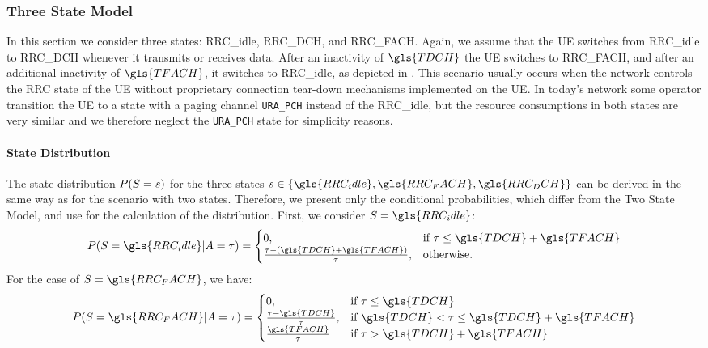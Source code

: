 \subsubsection*{Three State Model}\label{sec:network:performance_model:analytical_model:three_states}
In this section we consider three states: \gls{RRC_idle}, \gls{RRC_DCH}, and \gls{RRC_FACH}.
Again, we assume that the \gls{UE} switches from \gls{RRC_idle} to \gls{RRC_DCH} whenever it transmits or receives data.
After an inactivity of \(\gls{TDCH}\) the \gls{UE} switches to \gls{RRC_FACH}, and after an additional inactivity of \(\gls{TFACH}\), it switches to \gls{RRC_idle}, as depicted in .
This scenario usually occurs when the network controls the \gls{RRC} state of the \gls{UE} without proprietary connection tear-down mechanisms implemented on the \gls{UE}.
In today's network some operator transition the \gls{UE} to a state with a paging channel \texttt{URA\_PCH} instead of the \gls{RRC_idle}, but the resource consumptions in both states are very similar and we therefore neglect the \texttt{URA\_PCH} state for simplicity reasons.

\paragraph*{State Distribution}
The state distribution \(P(S=s)\) for the three states \(\RRCStateRealization\in\{\gls{RRC_idle},\gls{RRC_FACH},\gls{RRC_DCH}\}\) can be derived in the same way as for the scenario with two states.
Therefore, we present only the conditional probabilities, which differ from the Two State Model, and use  for the calculation of the distribution.
First, we consider \(\RRCState=\gls{RRC_idle}\): 
\begin{equation*} 
P(\RRCState=\gls{RRC_idle} \vert \PacketIAT = \ObservationIntervalLength) =
\begin{cases} 
	0,  & \mbox{if } \ObservationIntervalLength \leq \gls{TDCH}+\gls{TFACH} \\ 
	\frac{\ObservationIntervalLength - (\gls{TDCH}+\gls{TFACH})}{\ObservationIntervalLength}, 
	    & \mbox{otherwise.}
\end{cases}
\end{equation*}
For the case of \(\RRCState=\gls{RRC_FACH}\), we have:
\begin{equation*} 
P(\RRCState=\gls{RRC_FACH} \vert \PacketIAT = \ObservationIntervalLength) =
\begin{cases} 
	0,  & \mbox{if } \ObservationIntervalLength \leq \gls{TDCH} \\ 
	\frac{\ObservationIntervalLength - \gls{TDCH}}{\ObservationIntervalLength}, 
	    & \mbox{if }\gls{TDCH}<\ObservationIntervalLength\leq \gls{TDCH}+\gls{TFACH} \\
	\frac{\gls{TFACH}}{\ObservationIntervalLength} 
	    & \mbox{if } \ObservationIntervalLength > \gls{TDCH}+\gls{TFACH} 
\end{cases}
\end{equation*}

